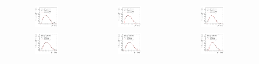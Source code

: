 \begin{figure}[ht]
  \centering
  \begin{tabular}{ccc}
    \includegraphics[width=0.3\textwidth]{figures/ResFit_Spring10QCDFlat_CB_Eta0_Spectrum_PtBin0} &
    \includegraphics[width=0.3\textwidth]{figures/ResFit_Spring10QCDFlat_CB_Eta0_Spectrum_PtBin1} &
    \includegraphics[width=0.3\textwidth]{figures/ResFit_Spring10QCDFlat_CB_Eta0_Spectrum_PtBin2} \\

    \includegraphics[width=0.3\textwidth]{figures/ResFit_Spring10QCDFlat_CB_Eta0_Spectrum_PtBin3} &
    \includegraphics[width=0.3\textwidth]{figures/ResFit_Spring10QCDFlat_CB_Eta0_Spectrum_PtBin4} &
    \includegraphics[width=0.3\textwidth]{figures/ResFit_Spring10QCDFlat_CB_Eta0_Spectrum_PtBin5} \\


\end{tabular}
\end{figure}
